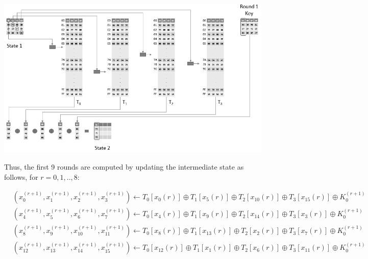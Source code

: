 \begin{center}
\includegraphics[scale=0.5,natwidth=916,natheight=528]{Figures/aes-1-1.png}
\label{fig: The diagram shows how $x_0^1,x_1^1,x_2^1,x_3^1$ are computed.}
\end{center}

\begin{flushleft}
Thus, the first 9 rounds are computed by updating the intermediate state as follows, for $r=0,1,..,8$:
\end{flushleft}
\begin{small}
\begin{align*}
&(x_0^{(r+1)},x_1^{(r+1)},x_2^{(r+1)},x_3^{(r+1)}) \gets T_0[x_0{(r)}] \oplus T_1[x_5{(r)}] \oplus T_2[x_{10}{(r)}] \oplus T_3[x_{15}{(r)}] \oplus K_0^{(r+1)}\\
&(x_4^{(r+1)},x_5^{(r+1)},x_6^{(r+1)},x_7^{(r+1)}) \gets T_0[x_4{(r)}] \oplus T_1[x_9{(r)}] \oplus T_2[x_{14}{(r)}] \oplus T_3[x_{3}{(r)}] \oplus K_0^{(r+1)}\\
&(x_8^{(r+1)},x_9^{(r+1)},x_{10}^{(r+1)},x_{11}^{(r+1)}) \gets T_0[x_8{(r)}] \oplus T_1[x_{13}{(r)}] \oplus T_2[x_{2}{(r)}] \oplus T_3[x_{7}{(r)}] \oplus K_0^{(r+1)}\\
&(x_{12}^{(r+1)},x_{13}^{(r+1)},x_{14}^{(r+1)},x_{15}^{(r+1)}) \gets T_0[x_{12}{(r)}] \oplus T_1[x_1{(r)}] \oplus T_2[x_{6}{(r)}] \oplus T_3[x_{11}{(r)}] \oplus K_0^{(r+1)}
\end{align*}
\end{small}

